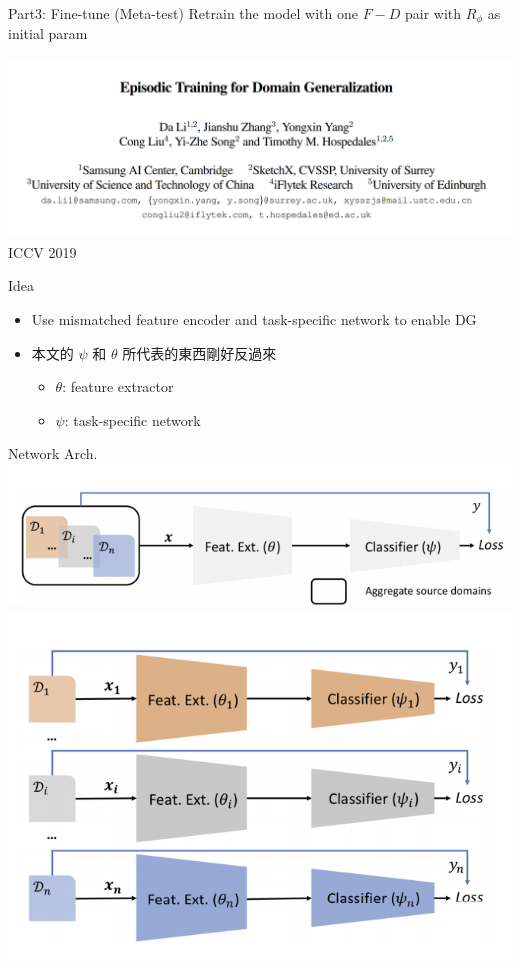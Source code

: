 \documentclass{beamer}
\begin{document}
\begin{frame}{Part3: Fine-tune (Meta-test)}
  Retrain the model with one $F-D$ pair with $R_\phi$ as initial param
\end{frame}

\begin{frame}
  \includegraphics[width=\textwidth]{fig/EpiFCR-title.png}
  \center ICCV 2019
\end{frame}

\begin{frame}{Idea}
  \begin{itemize}
    \item Use mismatched feature encoder and task-specific network to enable DG
    \item 本文的 $\psi$ 和 $\theta$ 所代表的東西剛好反過來
      \begin{itemize}
        \item $\theta$: feature extractor
        \item $\psi$: task-specific network
      \end{itemize}
  \end{itemize}
\end{frame}

\begin{frame}{Network Arch.}
  \includegraphics[width=.5\textwidth]{fig/epi-agg.png}
  \includegraphics[width=.5\textwidth]{fig/epi-ind.png}
\end{frame}
\end{document}
